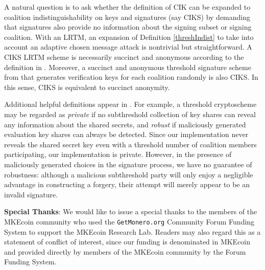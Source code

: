 \documentclass{mrl}
\theoremstyle{definition}
\begin{document}
A natural question is to ask whether the definition of CIK can be expanded to coalition indistinguishability on keys and signatures (say CIKS) by demanding that signatures also provide no information about the signing subset or signing coalition.  With an LRTM, an expansion of Definition \ref{threshIndist} to take into account an adaptive chosen message attack is nontrivial but straightforward. A CIKS LRTM scheme is necessarily succinct and anonymous according to the definition in \cite{bonehthreshold}. Moreover, a succinct and anonymous threshold signature scheme from \cite{bonehthreshold} that generates verification keys for each coalition randomly is also CIKS. In this sense, CIKS is equivalent to succinct anonymity. 


Additional helpful definitions appear in \cite{bonehthreshold}. For example, a threshold cryptoscheme may be regarded as \textit{private} if no subthreshold collection of key shares can reveal any information about the shared secrets, and \textit{robust} if maliciously generated evaluation key shares can always be detected. Since our implementation never reveals the shared secret key even with a threshold number of coalition members participating, our implementation is private. However, in the presence of maliciously generated choices in the signature process, we have no guarantee of robustness: although a malicious subthreshold party will only enjoy a negligible advantage in constructing a forgery, their attempt will merely appear to be an invalid signature.

\vspace{0.1in}

\textbf{Special Thanks}: We would like to issue a special thanks to the members of the MKEcoin community who used the \texttt{GetMonero.org} Community Forum Funding System to support the MKEcoin Research Lab. Readers may also regard this as a statement of conflict of interest, since our funding is denominated in MKEcoin and provided directly by members of the MKEcoin community by the Forum Funding System.

\medskip{}



\end{document}
